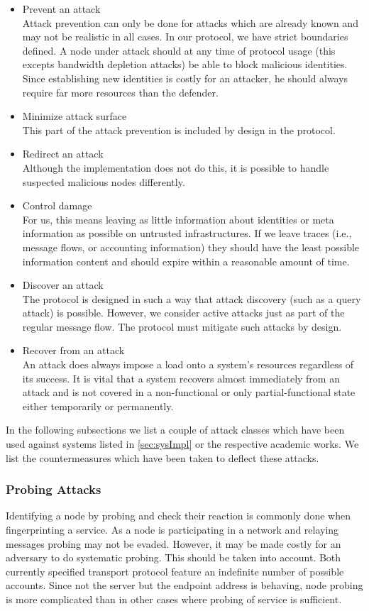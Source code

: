 \begin{itemize}
\item Prevent an attack\\
      Attack prevention can only be done for attacks which are already known and may not be realistic in all cases. In our protocol, we have strict boundaries defined. A node under attack should at any time of protocol usage (this excepts bandwidth depletion attacks) be able to block malicious identities. Since establishing new identities is costly for an attacker, he should always require far more resources than the defender.
\item Minimize attack surface\\
      This part of the attack prevention is included by design in the protocol.
\item Redirect an attack\\
	  Although the implementation does not do this, it is possible to handle suspected malicious nodes differently.
\item Control damage\\
      For us, this means leaving as little information about identities or meta information as possible on untrusted infrastructures. If we leave traces (i.e., message flows, or accounting information) they should have the least possible information content and should expire within a reasonable amount of time.
\item Discover an attack\\
      The protocol is designed in such a way that attack discovery (such as a query attack) is possible. However, we consider active attacks just as part of the regular message flow. The protocol must mitigate such attacks by design.
\item Recover from an attack\\
      An attack does always impose a load onto a system's resources regardless of its success. It is vital that a system recovers almost immediately from an attack and is not covered in a non-functional or only partial-functional state either temporarily or permanently.
\end{itemize}

In the following subsections we list a couple of attack classes which have been used against systems listed in \ref{sec:sysImpl} or the respective academic works. We list the countermeasures which have been taken to deflect these attacks.

\subsubsection{Probing Attacks}
Identifying a node by probing and check their reaction is commonly done when fingerprinting a service. As a node is participating in a network and relaying messages probing may not be evaded. However, it may be made costly for an adversary to do systematic probing. This should be taken into account. Both currently specified transport protocol feature an indefinite number of possible accounts. Since not the server but the endpoint address is behaving, node probing is more complicated than in other cases where probing of service is sufficient. 

